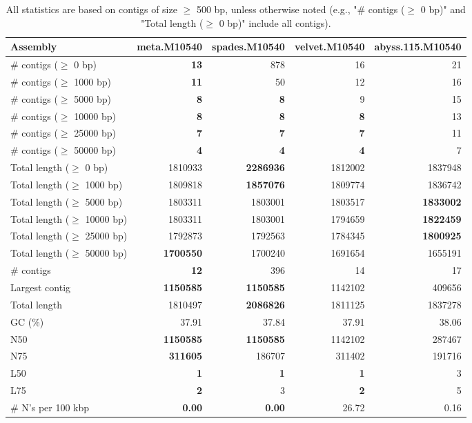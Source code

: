 \documentclass[12pt,a4paper]{article}
\begin{document}
\begin{table}[ht]
\begin{center}
\caption{All statistics are based on contigs of size $\geq$ 500 bp, unless otherwise noted (e.g., "\# contigs ($\geq$ 0 bp)" and "Total length ($\geq$ 0 bp)" include all contigs).}
\begin{tabular}{|l*{4}{|r}|}
\hline
Assembly & meta.M10540 & spades.M10540 & velvet.M10540 & abyss.115.M10540 \\ \hline
\# contigs ($\geq$ 0 bp) & {\bf 13} & 878 & 16 & 21 \\ \hline
\# contigs ($\geq$ 1000 bp) & {\bf 11} & 50 & 12 & 16 \\ \hline
\# contigs ($\geq$ 5000 bp) & {\bf 8} & {\bf 8} & 9 & 15 \\ \hline
\# contigs ($\geq$ 10000 bp) & {\bf 8} & {\bf 8} & {\bf 8} & 13 \\ \hline
\# contigs ($\geq$ 25000 bp) & {\bf 7} & {\bf 7} & {\bf 7} & 11 \\ \hline
\# contigs ($\geq$ 50000 bp) & {\bf 4} & {\bf 4} & {\bf 4} & 7 \\ \hline
Total length ($\geq$ 0 bp) & 1810933 & {\bf 2286936} & 1812002 & 1837948 \\ \hline
Total length ($\geq$ 1000 bp) & 1809818 & {\bf 1857076} & 1809774 & 1836742 \\ \hline
Total length ($\geq$ 5000 bp) & 1803311 & 1803001 & 1803517 & {\bf 1833002} \\ \hline
Total length ($\geq$ 10000 bp) & 1803311 & 1803001 & 1794659 & {\bf 1822459} \\ \hline
Total length ($\geq$ 25000 bp) & 1792873 & 1792563 & 1784345 & {\bf 1800925} \\ \hline
Total length ($\geq$ 50000 bp) & {\bf 1700550} & 1700240 & 1691654 & 1655191 \\ \hline
\# contigs & {\bf 12} & 396 & 14 & 17 \\ \hline
Largest contig & {\bf 1150585} & {\bf 1150585} & 1142102 & 409656 \\ \hline
Total length & 1810497 & {\bf 2086826} & 1811125 & 1837278 \\ \hline
GC (\%) & 37.91 & 37.84 & 37.91 & 38.06 \\ \hline
N50 & {\bf 1150585} & {\bf 1150585} & 1142102 & 287467 \\ \hline
N75 & {\bf 311605} & 186707 & 311402 & 191716 \\ \hline
L50 & {\bf 1} & {\bf 1} & {\bf 1} & 3 \\ \hline
L75 & {\bf 2} & 3 & {\bf 2} & 5 \\ \hline
\# N's per 100 kbp & {\bf 0.00} & {\bf 0.00} & 26.72 & 0.16 \\ \hline
\end{tabular}
\end{center}
\end{table}
\end{document}
